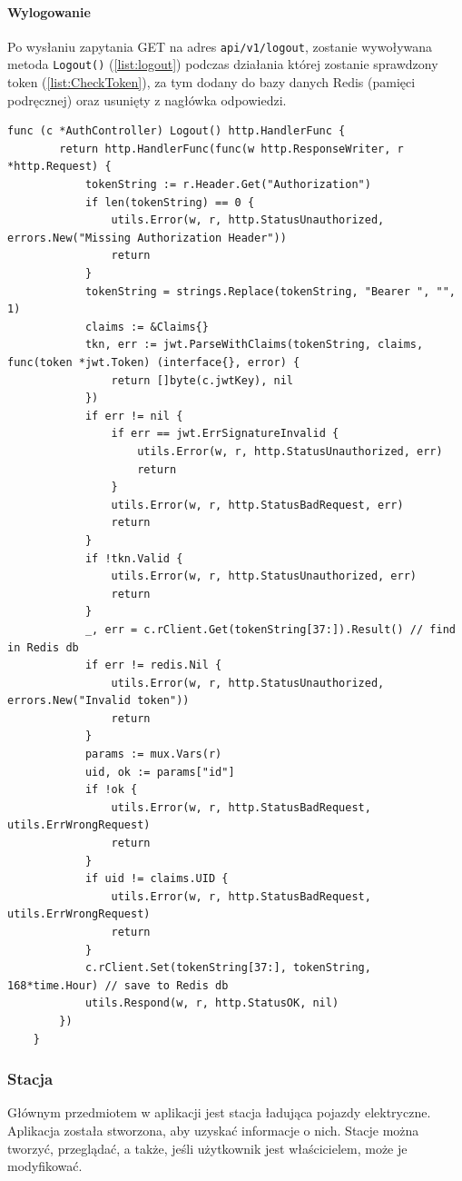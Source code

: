 \paragraph{Wylogowanie\newline}
Po wysłaniu zapytania GET na adres \texttt{api/v1/logout}, zostanie wywoływana metoda \texttt{Logout()} (\ref{list:logout}) podczas działania której zostanie sprawdzony token (\ref{list:CheckToken}), za tym dodany do bazy danych Redis (pamięci podręcznej) oraz usunięty z nagłówka odpowiedzi.
\begin{lstlisting}[label=list:logout,caption=Wylogowanie,basicstyle=\tiny\ttfamily]
    func (c *AuthController) Logout() http.HandlerFunc {
        return http.HandlerFunc(func(w http.ResponseWriter, r *http.Request) {
            tokenString := r.Header.Get("Authorization")
            if len(tokenString) == 0 {
                utils.Error(w, r, http.StatusUnauthorized, errors.New("Missing Authorization Header"))
                return
            }
            tokenString = strings.Replace(tokenString, "Bearer ", "", 1)
            claims := &Claims{}
            tkn, err := jwt.ParseWithClaims(tokenString, claims, func(token *jwt.Token) (interface{}, error) {
                return []byte(c.jwtKey), nil
            })
            if err != nil {
                if err == jwt.ErrSignatureInvalid {
                    utils.Error(w, r, http.StatusUnauthorized, err)
                    return
                }
                utils.Error(w, r, http.StatusBadRequest, err)
                return
            }
            if !tkn.Valid {
                utils.Error(w, r, http.StatusUnauthorized, err)
                return
            }
            _, err = c.rClient.Get(tokenString[37:]).Result() // find in Redis db
            if err != redis.Nil {
                utils.Error(w, r, http.StatusUnauthorized, errors.New("Invalid token"))
                return
            }
            params := mux.Vars(r)
            uid, ok := params["id"]
            if !ok {
                utils.Error(w, r, http.StatusBadRequest, utils.ErrWrongRequest)
                return
            }
            if uid != claims.UID {
                utils.Error(w, r, http.StatusBadRequest, utils.ErrWrongRequest)
                return
            }
            c.rClient.Set(tokenString[37:], tokenString, 168*time.Hour) // save to Redis db
            utils.Respond(w, r, http.StatusOK, nil)
        })
    }
\end{lstlisting}

\subsubsection{Stacja\newline}
Głównym przedmiotem w aplikacji jest stacja ładująca pojazdy elektryczne. Aplikacja została stworzona, aby uzyskać informacje o nich. Stacje można tworzyć, przeglądać, a także, jeśli użytkownik jest właścicielem, może je modyfikować.

